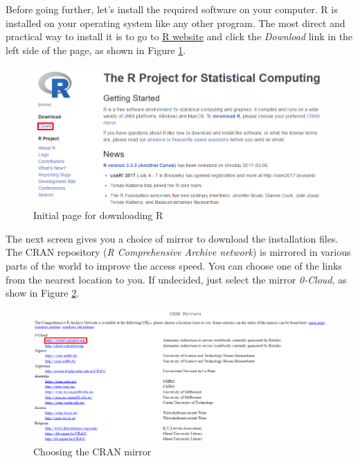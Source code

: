 \documentclass[11pt,]{book}
\begin{document}
Before going further, let's install the required software on your
computer. R is installed on your operating system like any other
program. The most direct and practical way to install it is to go to
\href{http://www.r-project.org/}{R website} and click the
\emph{Download} link in the left side of the page, as shown in Figure
\ref{fig:website-cran-1}.

\begin{figure}[!htbp]

{\centering \includegraphics[width=1\linewidth]{figs/website_cran_1} 

}

\caption{Initial page for downloading R}\label{fig:website-cran-1}
\end{figure}

The next screen gives you a choice of mirror to download the
installation files. The CRAN repository (\emph{R Comprehensive Archive
network}) is mirrored in various parts of the world to improve the
access speed. You can choose one of the links from the nearest location
to you. If undecided, just select the mirror \emph{0-Cloud}, as show in
Figure \ref{fig:website-cran-2}.

\begin{figure}[!htbp]

{\centering \includegraphics[width=1\linewidth]{figs/website_cran_2} 

}

\caption{Choosing the CRAN mirror}\label{fig:website-cran-2}
\end{figure}
\end{document}

